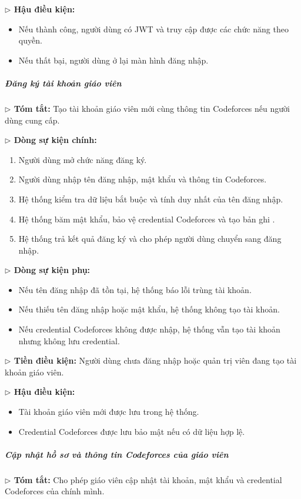 \documentclass[12pt,a4paper]{article}
\newcommand{\code}[1]{{\ttfamily\seqsplit{#1}}}
\begin{document}
\textbf{$\triangleright$ Hậu điều kiện:}
\begin{itemize}[leftmargin=*]
\item Nếu thành công, người dùng có JWT và truy cập được các chức năng theo quyền.
\item Nếu thất bại, người dùng ở lại màn hình đăng nhập.
\end{itemize}

\subparagraph{Đăng ký tài khoản giáo viên}
\textbf{$\triangleright$ Tóm tắt:} Tạo tài khoản giáo viên mới cùng thông tin Codeforces nếu người dùng cung cấp.

\textbf{$\triangleright$ Dòng sự kiện chính:}
\begin{enumerate}[leftmargin=*]
\item Người dùng mở chức năng đăng ký.
\item Người dùng nhập tên đăng nhập, mật khẩu và thông tin Codeforces.
\item Hệ thống kiểm tra dữ liệu bắt buộc và tính duy nhất của tên đăng nhập.
\item Hệ thống băm mật khẩu, bảo vệ credential Codeforces và tạo bản ghi \code{Teacher}.
\item Hệ thống trả kết quả đăng ký và cho phép người dùng chuyển sang đăng nhập.
\end{enumerate}

\textbf{$\triangleright$ Dòng sự kiện phụ:}
\begin{itemize}[leftmargin=*]
\item Nếu tên đăng nhập đã tồn tại, hệ thống báo lỗi trùng tài khoản.
\item Nếu thiếu tên đăng nhập hoặc mật khẩu, hệ thống không tạo tài khoản.
\item Nếu credential Codeforces không được nhập, hệ thống vẫn tạo tài khoản nhưng không lưu credential.
\end{itemize}

\textbf{$\triangleright$ Tiền điều kiện:} Người dùng chưa đăng nhập hoặc quản trị viên đang tạo tài khoản giáo viên.

\textbf{$\triangleright$ Hậu điều kiện:}
\begin{itemize}[leftmargin=*]
\item Tài khoản giáo viên mới được lưu trong hệ thống.
\item Credential Codeforces được lưu bảo mật nếu có dữ liệu hợp lệ.
\end{itemize}

\subparagraph{Cập nhật hồ sơ và thông tin Codeforces của giáo viên}
\textbf{$\triangleright$ Tóm tắt:} Cho phép giáo viên cập nhật tài khoản, mật khẩu và credential Codeforces của chính mình.
\end{document}
